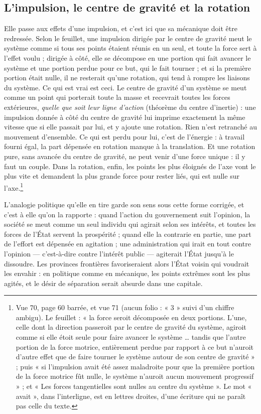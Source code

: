 \documentclass[11pt,a4paper]{article}
\begin{document}
\subsection*{L'impulsion, le centre de gravité et la rotation}

Elle passe aux effets d'une impulsion, et c'est ici que sa mécanique doit être
redressée. Selon le feuillet, une impulsion dirigée par le centre de gravité
meut le système comme si tous ses points étaient réunis en un seul, et toute la
force sert à l'effet voulu ; dirigée à côté, elle se décompose en une portion
qui fait avancer le système et une portion perdue pour ce but, qui le fait
tourner ; et si la première portion était nulle, il ne resterait qu'une rotation,
qui tend à rompre les liaisons du système. Ce qui est vrai est ceci. Le centre
de gravité d'un système se meut comme un point qui porterait toute la masse et
recevrait toutes les forces extérieures, \emph{quelle que soit leur ligne
d'action} (théorème du centre d'inertie) : une impulsion donnée à côté du centre
de gravité lui imprime exactement la même vitesse que si elle passait par lui,
et y ajoute une rotation. Rien n'est retranché au mouvement d'ensemble. Ce qui
est perdu pour lui, c'est de l'énergie : à travail fourni égal, la part dépensée
en rotation manque à la translation. Et une rotation pure, sans avancée du
centre de gravité, ne peut venir d'une force unique : il y faut un couple. Dans
la rotation, enfin, les points les plus éloignés de l'axe vont le plus vite et
demandent la plus grande force pour rester liés, qui est nulle sur
l'axe.\footnote{Vue 70, page 60 barrée, et vue 71 (aucun folio : « 3 » suivi
d'un chiffre ambigu). Le feuillet : « la force seroit décomposée en deux
portions. L'une, celle dont la direction passeroit par le centre de gravité du
système, agiroit comme si elle étoit seule pour faire avancer le système \ldots{}
tandis que l'autre portion de la force motrice, entièrement perdue par rapport à
ce but n'auroit d'autre effet que de faire tourner le système autour de son
centre de gravité » ; puis « si l'impulsion avait été assez maladroite pour que
la première portion de la force motrice fût nulle, le système n'auroit aucun
mouvement progressif » ; et « Les forces tangentielles sont nulles au centre du
système ». Le mot « avait », dans l'interligne, est en lettres droites, d'une
écriture qui ne paraît pas celle du texte.}

L'analogie politique qu'elle en tire garde son sens sous cette forme corrigée,
et c'est à elle qu'on la rapporte : quand l'action du gouvernement suit
l'opinion, la société se meut comme un seul individu qui agirait selon ses
intérêts, et toutes les forces de l'État servent la prospérité ; quand elle la
contrarie en partie, une part de l'effort est dépensée en agitation ; une
administration qui irait en tout contre l'opinion — c'est-à-dire contre
l'intérêt public — agiterait l'État jusqu'à le dissoudre. Les provinces
frontières favoriseraient alors l'État voisin qui voudrait les envahir : en
politique comme en mécanique, les points extrêmes sont les plus agités, et le
désir de séparation serait absurde dans une capitale.
\end{document}
